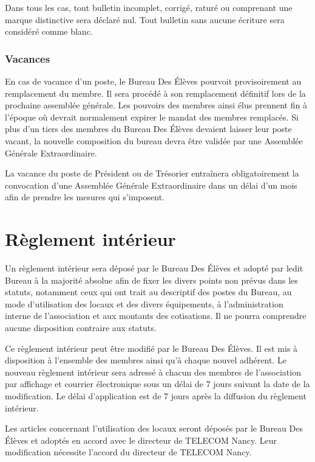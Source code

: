 \documentclass{article} %
\begin{document}
				Dans tous les cas, tout bulletin incomplet, corrigé, raturé ou
				comprenant une marque distinctive sera déclaré nul. Tout bulletin
				sans aucune écriture sera considéré comme blanc.

			\subsubsection{Vacances}
				En cas de vacance d'un poste, le Bureau Des Élèves pourvoit
				provisoirement au remplacement du membre. Il sera procédé à son
				remplacement définitif lors de la prochaine assemblée générale. Les
				pouvoirs des membres ainsi élus prennent fin à l’époque où devrait
				normalement expirer le mandat des membres remplacés. Si plus d’un
				tiers des membres du Bureau Des Élèves devaient laisser leur poste
				vacant, la nouvelle composition du bureau devra être validée par une
				Assemblée Générale Extraordinaire.

				La vacance du poste de Président ou de Trésorier entraînera
				obligatoirement la convocation d’une Assemblée Générale
				Extraordinaire dans un délai d’un mois afin de prendre les mesures
				qui s’imposent.

	\section{Règlement intérieur}
		Un règlement intérieur sera déposé par le Bureau Des Élèves et adopté par
		ledit Bureau à la majorité absolue afin de fixer les divers points non prévus
		dans les statuts, notamment ceux qui ont trait au descriptif des postes du
		Bureau, au mode d’utilisation des locaux et des divers équipements, à
		l’administration interne de l’association et aux montants des cotisations. Il
		ne pourra comprendre aucune disposition contraire aux statuts.

		Ce règlement intérieur peut être modifié par le Bureau Des Élèves. Il est mis
		à disposition à l’ensemble des membres ainsi qu’à chaque nouvel adhérent. Le
		nouveau règlement intérieur sera adressé à chacun des membres de
		l'association par affichage et courrier électronique sous un délai de 7 jours
		suivant la date de la modification. Le délai d’application est de 7 jours
		après la diffusion du règlement intérieur.

		Les articles concernant l’utilisation des locaux seront déposés par le Bureau
		Des Élèves et adoptés en accord avec le directeur de TELECOM Nancy.	Leur
		modification nécessite l’accord du directeur de TELECOM Nancy.
\end{document}
